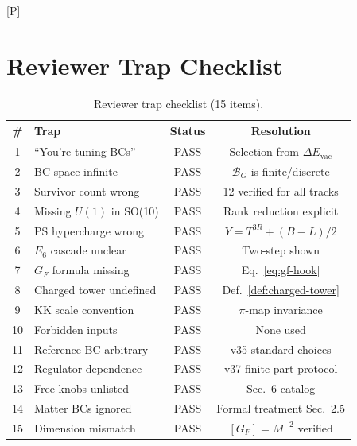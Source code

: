 \documentclass[11pt,a4paper]{article}
\newcommand{\tagP}{\textcolor{green!50!black}{[P]}}
\begin{document}
\tagP

\section{Reviewer Trap Checklist}

\begin{table}[h]
\centering
\begin{tabular}{clcc}
\toprule
\# & Trap & Status & Resolution \\
\midrule
1 & ``You're tuning BCs'' & PASS & Selection from $\Delta E_{\text{vac}}$ \\
2 & BC space infinite & PASS & $\mathcal{B}_G$ is finite/discrete \\
3 & Survivor count wrong & PASS & 12 verified for all tracks \\
4 & Missing $U(1)$ in SO(10) & PASS & Rank reduction explicit \\
5 & PS hypercharge wrong & PASS & $Y = T^{3R} + (B-L)/2$ \\
6 & $E_6$ cascade unclear & PASS & Two-step shown \\
7 & $G_F$ formula missing & PASS & Eq.~\eqref{eq:gf-hook} \\
8 & Charged tower undefined & PASS & Def.~\ref{def:charged-tower} \\
9 & KK scale convention & PASS & $\pi$-map invariance \\
10 & Forbidden inputs & PASS & None used \\
11 & Reference BC arbitrary & PASS & v35 standard choices \\
12 & Regulator dependence & PASS & v37 finite-part protocol \\
13 & Free knobs unlisted & PASS & Sec.~6 catalog \\
14 & Matter BCs ignored & PASS & Formal treatment Sec.~2.5 \\
15 & Dimension mismatch & PASS & $[G_F] = M^{-2}$ verified \\
\bottomrule
\end{tabular}
\caption{Reviewer trap checklist (15 items).}
\label{tab:traps}
\end{table}
\end{document}
